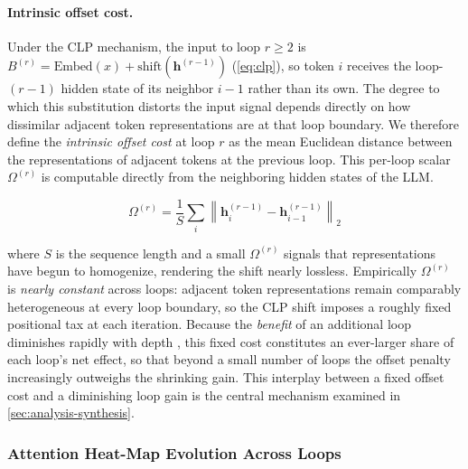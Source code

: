 \documentclass{llmxive}
\providecommand{\hidden}{\mathbf{h}}
\begin{document}
\paragraph{Intrinsic offset cost.}
Under the CLP mechanism, the input to loop $r \geq 2$ is
$B^{(r)} = \mathrm{Embed}(x) + \mathrm{shift}(\hidden^{(r-1)})$
(\autoref{eq:clp}), so token $i$ receives the loop-$(r{-}1)$ hidden state
of its neighbor $i{-}1$ rather than its own.
The degree to which this substitution distorts the input signal depends
directly on how dissimilar adjacent token representations are at that
loop boundary.
We therefore define the \emph{intrinsic offset cost} at loop $r$ as the mean
Euclidean distance between the representations of adjacent tokens at the
previous loop. This per-loop scalar $\Omega^{(r)}$ is computable directly from the neighboring hidden states of the LLM.
\begin{MiddleEquation}
\begin{equation}
  \Omega^{(r)} =
  \frac{1}{S}\sum_{i} \left\|\hidden^{(r-1)}_i - \hidden^{(r-1)}_{i-1}\right\|_2
  \label{eq:offset-cost}
\end{equation}
\end{MiddleEquation}where $S$ is the sequence length and a small $\Omega^{(r)}$
signals that representations have begun to homogenize, rendering the
shift nearly lossless.
Empirically $\Omega^{(r)}$ is \emph{nearly constant} across loops: adjacent
token representations remain comparably heterogeneous at every loop boundary,
so the CLP shift imposes a roughly fixed positional tax at each iteration.
Because the \emph{benefit} of an additional loop diminishes rapidly with depth
, this fixed cost
constitutes an ever-larger share of each loop's net effect, so that beyond a
small number of loops the offset penalty increasingly outweighs the shrinking
gain.
This interplay between a fixed offset cost and a diminishing loop gain is the
central mechanism examined in \autoref{sec:analysis-synthesis}.

\subsubsection{Attention Heat-Map Evolution Across Loops}
\label{sec:analysis-attn}
\end{document}
